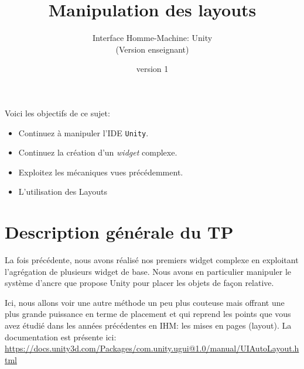 \documentclass[a4paper,10pt]{article}
\newenvironment{attention}%
{\begin{tcolorbox}[breakable,colback=green!25!white,colframe=red!55!black,title=Attention]}%
{\end{tcolorbox}}
\begin{document}
	


\title{\vspace*{-1cm}Manipulation des layouts}
\author{\vspace*{-1.5cm}Interface Homme-Machine: Unity
\begin{ensnote}
	(Version enseignant)
\end{ensnote}
}
\date{\vspace*{-1.5cm}version 1}
\maketitle
\thispagestyle{fancy}

Voici les objectifs de ce sujet:
\begin{itemize}
	\item Continuez à manipuler l'IDE \texttt{Unity}.
	\item Continuez la création d'un \textit{widget} complexe.
	\item Exploitez les mécaniques vues précédemment.
	\item L'utilisation des Layouts
\end{itemize}


%	

\section*{Description générale du TP}

La fois précédente, nous avons réalisé nos premiers widget complexe en exploitant l'agrégation de plusieurs widget de base. Nous avons en particulier manipuler le système d'ancre que propose Unity pour placer les objets de façon relative.

Ici, nous allons voir une autre méthode un peu plus couteuse mais offrant une plus grande puissance en terme de placement et qui reprend les points que vous avez étudié dans les années précédentes en IHM: les mises en pages (layout). La documentation est présente ici: \url{https://docs.unity3d.com/Packages/com.unity.ugui@1.0/manual/UIAutoLayout.html}
\end{document}
